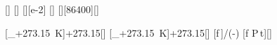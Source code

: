 [\degreeCelsius]
[\degreeCelsius]
[\percent][e-2]
[\watt]
[\day][86400][\second]

[\vartheta_+\SI{273.15}{\kelvin}]{\tkX+273.15}[\kelvin]
[\vartheta_+\SI{273.15}{\kelvin}]{\twX+273.15}[\kelvin]
[f\,]{\frX*\TkX/(\TwX-\TkX)}
[f\,\,P\,t]{\eKX*\PkX*\tdX}[\joule]
